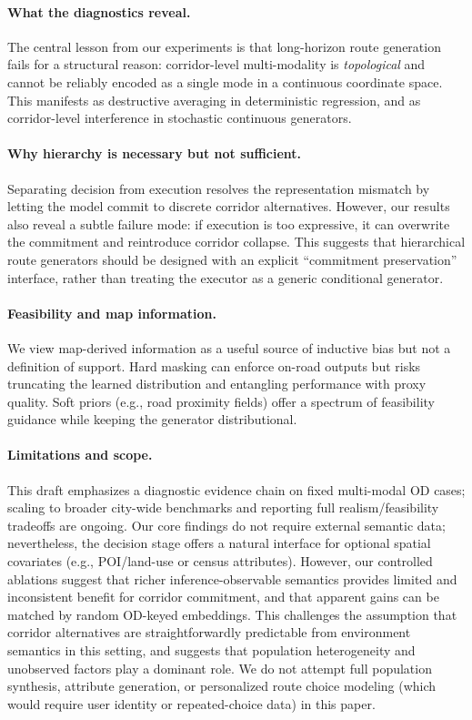\paragraph{What the diagnostics reveal.}
The central lesson from our experiments is that long-horizon route generation fails for a structural reason: corridor-level multi-modality is \emph{topological} and cannot be reliably encoded as a single mode in a continuous coordinate space.
This manifests as destructive averaging in deterministic regression, and as corridor-level interference in stochastic continuous generators.

\paragraph{Why hierarchy is necessary but not sufficient.}
Separating decision from execution resolves the representation mismatch by letting the model commit to discrete corridor alternatives.
However, our results also reveal a subtle failure mode: if execution is too expressive, it can overwrite the commitment and reintroduce corridor collapse.
This suggests that hierarchical route generators should be designed with an explicit ``commitment preservation'' interface, rather than treating the executor as a generic conditional generator.

\paragraph{Feasibility and map information.}
We view map-derived information as a useful source of inductive bias but not a definition of support.
Hard masking can enforce on-road outputs but risks truncating the learned distribution and entangling performance with proxy quality.
Soft priors (e.g., road proximity fields) offer a spectrum of feasibility guidance while keeping the generator distributional.

\paragraph{Limitations and scope.}
This draft emphasizes a diagnostic evidence chain on fixed multi-modal OD cases; scaling to broader city-wide benchmarks and reporting full realism/feasibility tradeoffs are ongoing.
Our core findings do not require external semantic data; nevertheless, the decision stage offers a natural interface for optional spatial covariates (e.g., POI/land-use or census attributes).
However, our controlled ablations suggest that richer inference-observable semantics provides limited and inconsistent benefit for corridor commitment, and that apparent gains can be matched by random OD-keyed embeddings.
This challenges the assumption that corridor alternatives are straightforwardly predictable from environment semantics in this setting, and suggests that population heterogeneity and unobserved factors play a dominant role.
We do not attempt full population synthesis, attribute generation, or personalized route choice modeling (which would require user identity or repeated-choice data) in this paper.

